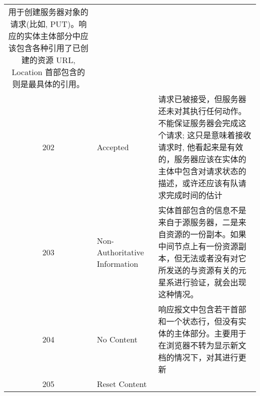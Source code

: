 \begin{longtable}[]{@{}cll@{}}
\begin{minipage}[t]{0.30\columnwidth}
用于创建服务器对象的请求(比如,
PUT)。响应的实体主体部分中应该包含各种引用了已创建的资源 URL, Location
首部包含的则是最具体的引用。\strut
\end{minipage}\tabularnewline
\begin{minipage}[t]{0.32\columnwidth}\centering\strut
202\strut
\end{minipage} & \begin{minipage}[t]{0.30\columnwidth}\raggedright\strut
Accepted\strut
\end{minipage} & \begin{minipage}[t]{0.30\columnwidth}\raggedright\strut
请求已被接受，但服务器还未对其执行任何动作。不能保证服务器会完成这个请求;
这只是意味着接收请求时,
他看起来是有效的，服务器应该在实体的主体中包含对请求状态的描述，或许还应该有队请求完成时间的估计\strut
\end{minipage}\tabularnewline
\begin{minipage}[t]{0.32\columnwidth}\centering\strut
203\strut
\end{minipage} & \begin{minipage}[t]{0.30\columnwidth}\raggedright\strut
Non-Authoritative Information\strut
\end{minipage} & \begin{minipage}[t]{0.30\columnwidth}\raggedright\strut
实体首部包含的信息不是来自于源服务器，二是来自资源的一份副本。如果中间节点上有一份资源副本，但无法或者没有对它所发送的与资源有关的元星系进行验证，就会出现这种情况。\strut
\end{minipage}\tabularnewline
\begin{minipage}[t]{0.32\columnwidth}\centering\strut
204\strut
\end{minipage} & \begin{minipage}[t]{0.30\columnwidth}\raggedright\strut
No Content\strut
\end{minipage} & \begin{minipage}[t]{0.30\columnwidth}\raggedright\strut
响应报文中包含若干首部和一个状态行，但没有实体的主体部分。主要用于在浏览器不转为显示新文档的情况下，对其进行更新\strut
\end{minipage}\tabularnewline
\begin{minipage}[t]{0.32\columnwidth}\centering\strut
205\strut
\end{minipage} & \begin{minipage}[t]{0.30\columnwidth}\raggedright\strut
Reset Content\strut
\end{minipage} & \begin{minipage}[t]{0.30\columnwidth}\raggedright\strut

\end{minipage}
\end{longtable}
